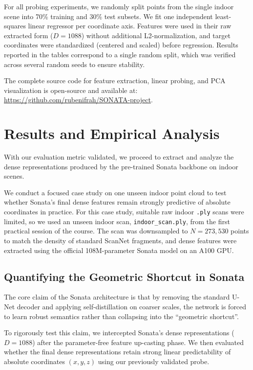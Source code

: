 \documentclass[11pt, a4paper]{article}
\begin{document}
For all probing experiments, we randomly split points from the single indoor scene into 70\% training and 30\% test subsets. We fit one independent least-squares linear regressor per coordinate axis. Features were used in their raw extracted form ($D=1088$) without additional L2-normalization, and target coordinates were standardized (centered and scaled) before regression. Results reported in the tables correspond to a single random split, which was verified across several random seeds to ensure stability.

The complete source code for feature extraction, linear probing, and PCA visualization is open-source and available at: \url{https://github.com/rubenifrah/SONATA-project}.

\section{Results and Empirical Analysis}

With our evaluation metric validated, we proceed to extract and analyze the dense representations produced by the pre-trained Sonata backbone on indoor scenes. 

We conduct a focused case study on one unseen indoor point cloud to test whether Sonata's final dense features remain strongly predictive of absolute coordinates in practice. For this case study, suitable raw indoor \texttt{.ply} scans were limited, so we used an unseen indoor scan, \texttt{indoor\_scan.ply}, from the first practical session of the course. The scan was downsampled to $N=273,530$ points to match the density of standard ScanNet fragments, and dense features were extracted using the official 108M-parameter Sonata model on an A100 GPU.

\subsection{Quantifying the Geometric Shortcut in Sonata}

The core claim of the Sonata architecture is that by removing the standard U-Net decoder and applying self-distillation on coarser scales, the network is forced to learn robust semantics rather than collapsing into the ``geometric shortcut''. 

To rigorously test this claim, we intercepted Sonata's dense representations ($D=1088$) after the parameter-free feature up-casting phase. We then evaluated whether the final dense representations retain strong linear predictability of absolute coordinates $(x, y, z)$ using our previously validated probe.
\end{document}
